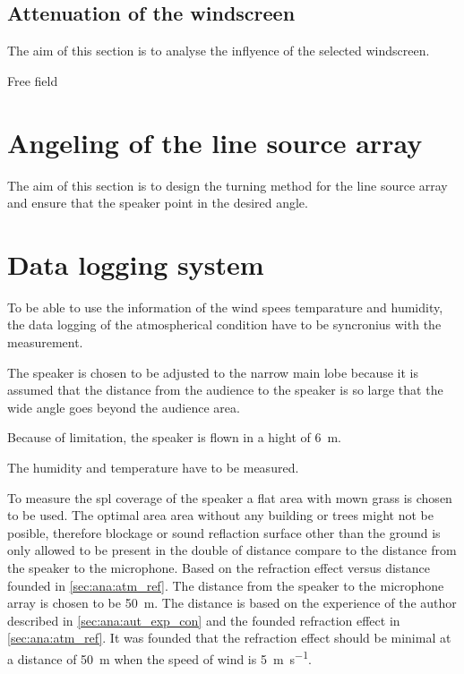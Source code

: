 \subsection{Attenuation of the windscreen} 
The aim of this section is to analyse the inflyence of the selected windscreen. 

Free field 




\section{Angeling of the line source array}
The aim of this section is to design the turning method for the line source array and ensure that the speaker point in the desired angle.





\section{Data logging system} 
To be able to use the information of the wind spees temparature and humidity, the data logging of the atmospherical condition have to be syncronius with the measurement. 


The speaker is chosen to be adjusted to the narrow main lobe because it is assumed that the distance from the audience to the speaker is so large that the wide angle goes beyond the audience area.

Because of limitation, the speaker is flown in a hight of \SI{6}{\meter}. 

The humidity and temperature have to be measured.

To measure the \gls{spl} coverage of the speaker a flat area with mown grass is chosen to be used. The optimal area area without any building or trees might not be posible, therefore blockage or sound reflaction surface other than the ground is only allowed to be present in the double of distance compare to the distance from the speaker to the microphone. Based on the refraction effect versus distance founded in \autoref{sec:ana:atm_ref}. The distance from the speaker to the microphone array is chosen to be \SI{50}{\meter}. The distance is based on the experience of the author described in \autoref{sec:ana:aut_exp_con} and the founded refraction effect in \autoref{sec:ana:atm_ref}. It was founded that the refraction effect should be minimal at a distance of \SI{50}{\meter} when the speed of wind is \SI{5}{\meter\per\second}. 


